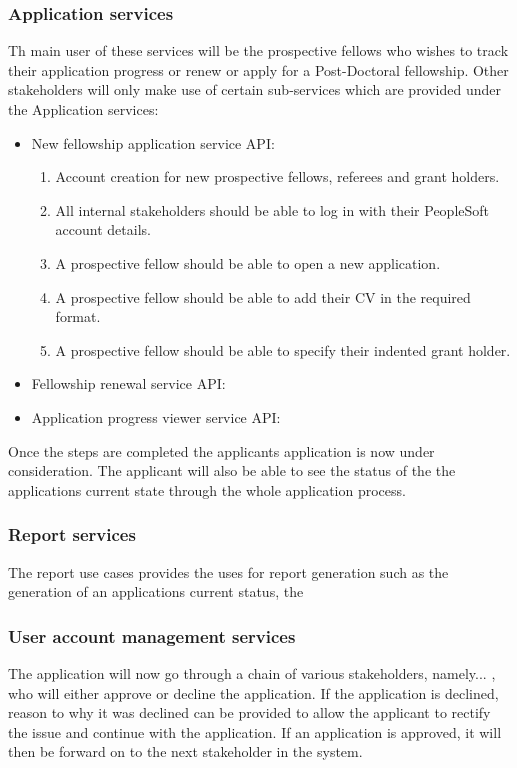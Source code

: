 \documentclass[12pt]{article}
\begin{document}
		\subsubsection{Application services}
		Th main user of these services will be the prospective fellows who wishes to track their application progress or renew or apply for a Post-Doctoral fellowship. Other stakeholders will only make use of certain sub-services which are provided under the Application services:
		
		\begin{itemize}
			\item New fellowship application service API:		
			\begin{enumerate}
				\item Account creation for new prospective fellows, referees and grant holders.
				\item All internal stakeholders should be able to log in with their PeopleSoft account details.				
				\item A prospective fellow should be able to open a new application. 
				\item A prospective fellow should be able to add their CV in the required format. 
				\item A prospective fellow should be able to specify their indented grant holder.
			\end{enumerate}
			
			\item Fellowship renewal service API:
			\item Application progress viewer service API:
		\end{itemize}
		
		Once the steps are completed the applicants application is now under consideration. The applicant will also be able to see the status of the the applications current state through the whole application process.
		\subsubsection{Report services}
		The report use cases provides the uses for report generation such as the generation of an applications current status, the			
		\subsubsection{User account management services}
		The application will now go through a chain of various stakeholders, namely... , who will either approve or decline the application. If the application is declined, reason to why it was declined can be provided to allow the applicant to rectify the issue and continue with the application. If an application is approved, it will then be forward on to the next stakeholder in the system.
\end{document}
